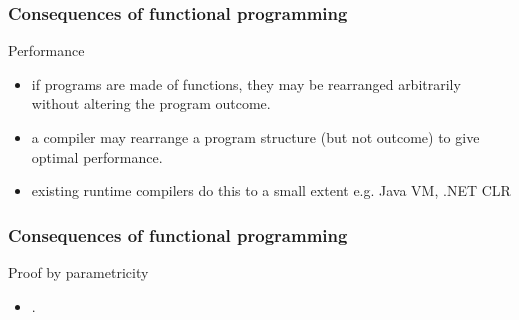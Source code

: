 \begin{frame}
\frametitle{Consequences of functional programming}
\begin{block}{Performance}
\begin{itemize}
\item<1-> if programs are made of functions, they may be rearranged arbitrarily without altering the program outcome.
\item<2-> a compiler may rearrange a program structure (but not outcome) to give optimal performance.
\item<3-> existing runtime compilers do this to a small extent e.g. Java VM, .NET CLR
\end{itemize}
\end{block}
\end{frame}

\begin{frame}
\frametitle{Consequences of functional programming}
\begin{block}{Proof by parametricity \cite{wadler1989theorems}}
\begin{itemize}
\item<1-> .
\end{itemize}
\end{block}
\end{frame}

